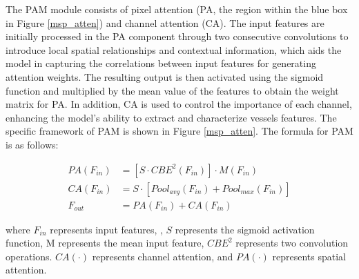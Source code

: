 \documentclass[a4paper,fleqn]{cas-dc}
\begin{document}
The PAM module consists of pixel attention (PA, the region within the blue box in Figure \ref{msp_atten}) and channel attention (CA). The input features are initially processed in the PA component through two consecutive convolutions to introduce local spatial relationships and contextual information, which aids the model in capturing the correlations between input features for generating attention weights. The resulting output is then activated using the sigmoid function and multiplied by the mean value of the features to obtain the weight matrix for PA. In addition, CA is used to control the importance of each channel, enhancing the model's ability to extract and characterize vessels features. The specific framework of PAM is shown in Figure \ref{msp_atten}.  The formula for PAM is as follows:

\begin{align}
PA(F_{in}) & = [S\cdot CBE^2(F_{in})]\cdot M(F_{in})\\
CA(F_{in})&=S \cdot [Pool_{avg}(F_{in})+Pool_{max}(F_{in})]\\
F_{out}&=PA(F_{in})+CA(F_{in})
\end{align}

where $F_{in}$ represents input features, , $S$ represents the sigmoid activation function, M represents the mean input feature, $CBE ^ 2$ represents two convolution operations. $CA (\cdot )$ represents channel attention, and $PA (\cdot )$ represents spatial attention.
\end{document}

